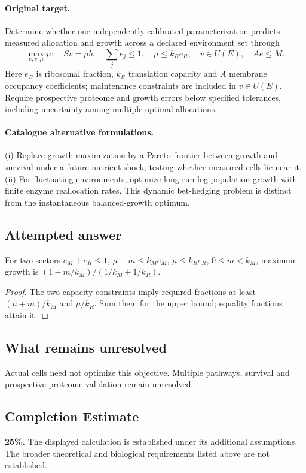 \documentclass[11pt]{article}
\begin{document}
\paragraph{Original target.}
Determine whether one independently calibrated parameterization predicts measured allocation and growth across a declared environment set through
\[\max_{e,v,\mu}\mu:\quad Sv=\mu b,\quad \sum_j e_j\le1,\quad \mu\le k_R e_R,\quad v\in U(E),\quad A e\le M.\]
Here $e_R$ is ribosomal fraction, $k_R$ translation capacity and $A$ membrane occupancy coefficients; maintenance constraints are included in $v\in U(E)$. Require prospective proteome and growth errors below specified tolerances, including uncertainty among multiple optimal allocations.
\paragraph{Catalogue alternative formulations.}
(i) Replace growth maximization by a Pareto frontier between growth and survival under a future nutrient shock, testing whether measured cells lie near it. (ii) For fluctuating environments, optimize long-run log population growth with finite enzyme reallocation rates. This dynamic bet-hedging problem is distinct from the instantaneous balanced-growth optimum.
\subsection{Attempted answer}
\begin{proposition}
For two sectors $e_M+e_R\leq1$, $\mu+m\leq k_Me_M$, $\mu\leq k_Re_R$, $0\leq m<k_M$, maximum growth is $(1-m/k_M)/(1/k_M+1/k_R)$.
\end{proposition}
\begin{proof}
The two capacity constraints imply required fractions at least $(\mu+m)/k_M$ and $\mu/k_R$. Sum them for the upper bound; equality fractions attain it.
\end{proof}
\subsection{What remains unresolved}
Actual cells need not optimize this objective. Multiple pathways, survival and prospective proteome validation remain unresolved.
\subsection{Completion Estimate}
\textbf{25\%.} The displayed calculation is established under its additional assumptions. The broader theoretical and biological requirements listed above are not established.
\end{document}
